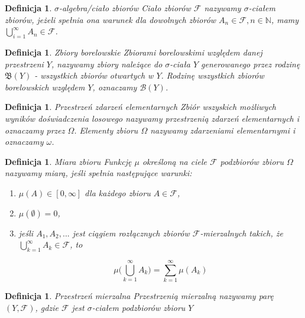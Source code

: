 \documentclass[12pt,a4paper]{report}
\newtheorem{definition}[theorem]{Definicja}
\begin{document}
\begin{definition}{$\sigma$-algebra/ciało zbiorów\cite[Rozdział 8.1]{rudnicki2006}}
Ciało zbiorów $\mathcal{F}$ nazywamy $\sigma$-ciałem zbiorów, jeżeli spełnia ona warunek
dla dowolnych zbiorów $A_{n} \in \mathcal{F}, n \in \mathbb{N}$, mamy
$\bigcup\limits_{i=1}^{\infty} A_n \in \mathcal{F}$.

\end{definition}


\begin{definition}{Zbiory borelowskie \cite[w opraciu o rozdział 2]{billingsley1987}}
Zbiorami borelowskimi względem danej przestrzeni $Y$, nazywamy zbiory należące do $\sigma$-ciała $Y$ generowanego przez rodzinę $\mathfrak{B}(Y)$ - wszystkich zbiorów otwartych w $Y$. Rodzinę wszystkich zbiorów borelowskich względem $Y$, oznaczamy $\mathcal{B}(Y)$.
\end{definition}


\begin{definition}{Przestrzeń zdarzeń elementarnych \cite[w oparciu o rozdział 1.1]{krysicki1999}}
Zbiór wszyskich możliwych wyników doświadczenia losowego nazywamy przestrzenią zdarzeń elementarnych i oznaczamy przez $\Omega$. Elementy zbioru $\Omega$ nazywamy zdarzeniami elementarnymi i oznaczamy $\omega$.
\end{definition}


\begin{definition}{Miara zbioru \cite[Rozdział 2.10] {billingsley1987}}
Funkcję $\mu$ określoną na ciele $\mathcal{F}$ podzbiorów zbioru $\Omega$ nazywamy miarą, jeśli spełnia następujące warunki: 
\begin{enumerate}
\item $\mu(A) \in [0, \infty]$ dla każdego zbioru $A \in \mathcal{F}$,
\item $\mu(\emptyset)=0$,
\item jeśli $A_1, A_2,...$ jest ciągiem rozłącznych zbiorów $\mathcal{F}$-mierzalnych takich, że $\bigcup\limits_{k=1}^{\infty} A_k \in \mathcal{F}$, to 

$$\mu\big(\bigcup\limits_{k=1}^{\infty} A_k\big)=\sum_{k=1}^{\infty} \mu(A_k)$$

\end{enumerate}
\end{definition}


\begin{definition}{Przestrzeń mierzalna \cite[Rozdział 2.10]{billingsley1987}}
Przestrzenią mierzalną nazywamy parę $(Y, \mathcal{F})$, gdzie $\mathcal{F}$ jest $\sigma$-ciałem podzbiorów zbioru $Y$
\end{definition}
\end{document}
